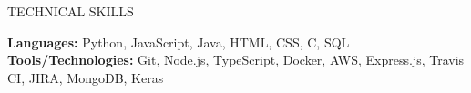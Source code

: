 \documentclass[letterpaper,11pt,oneside]{article}
\newcommand{\createHeading}[1]{
    \vspace{1.25em}
    \hline
    \vspace{-1.5ex}
    \begin{center}
        #1
    \end{center}
    \vspace{-1.5ex}
    \hline
    \vspace{1.25em}
}
\begin{document}
\createHeading{TECHNICAL SKILLS}
\begin{addmargin}[.6em]{.6em}
    \textbf{Languages: } Python, JavaScript, Java, HTML, CSS, C, SQL \\
    \textbf{Tools/Technologies: } Git, Node.js, TypeScript, Docker, AWS, Express.js, Travis CI, JIRA, MongoDB, Keras
\end{addmargin}
\end{document}
